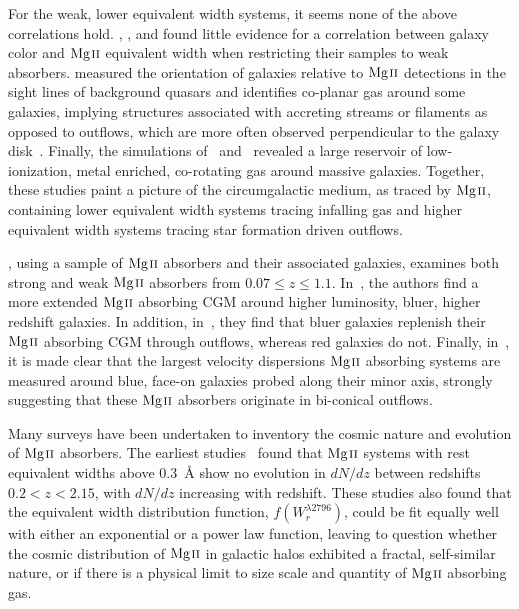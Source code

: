 \documentclass[iop,apj,numberedappendix,appendixfloats,twocolappendix]{emulateapj}
\begin{document}
For the weak, lower equivalent width systems, it seems none of the above correlations hold. \cite{Chen2010b}, \cite{Kacprzak2011}, and \cite{Lovegrove2011} found little evidence for a correlation between galaxy color and ${\hbox{{\rm Mg}\kern 0.1em{\sc ii}}}$ equivalent width when restricting their samples to weak absorbers. \cite{Kacprzak2011} measured the orientation of galaxies relative to ${\hbox{{\rm Mg}\kern 0.1em{\sc ii}}}$ detections in the sight lines of background quasars and identifies co-planar gas around some galaxies, implying structures associated with accreting streams or filaments as opposed to outflows, which are more often observed perpendicular to the galaxy disk~\citep{Bordoloi2011,Kacprzak2012-PA}. Finally, the simulations of~\cite{Stewart2011} and~\cite{Ford2013mass} revealed a large reservoir of low-ionization, metal enriched, co-rotating gas around massive galaxies. Together, these studies paint a picture of the circumgalactic medium, as traced by ${\hbox{{\rm Mg}\kern 0.1em{\sc ii}}}$, containing lower equivalent width systems tracing infalling gas and higher equivalent width systems tracing star formation driven outflows.

\cite{MAGIICAT1}, using a sample of ${\hbox{{\rm Mg}\kern 0.1em{\sc ii}}}$ absorbers and their associated galaxies, examines both strong and weak ${\hbox{{\rm Mg}\kern 0.1em{\sc ii}}}$ absorbers from $0.07 \le z \le 1.1$. In~\cite{MAGIICAT2}, the authors find a more extended ${\hbox{{\rm Mg}\kern 0.1em{\sc ii}}}$ absorbing CGM around higher luminosity, bluer, higher redshift galaxies. In addition, in~\cite{MAGIICAT4}, they find that bluer galaxies replenish their ${\hbox{{\rm Mg}\kern 0.1em{\sc ii}}}$ absorbing CGM through outflows, whereas red galaxies do not. Finally, in~\cite{MAGIICAT5}, it is made clear that the largest velocity dispersions ${\hbox{{\rm Mg}\kern 0.1em{\sc ii}}}$ absorbing systems are measured around blue, face-on galaxies probed along their minor axis, strongly suggesting that these ${\hbox{{\rm Mg}\kern 0.1em{\sc ii}}}$ absorbers originate in bi-conical outflows.

Many surveys have been undertaken to inventory the cosmic nature and evolution of ${\hbox{{\rm Mg}\kern 0.1em{\sc ii}}}$ absorbers. The earliest studies~\citep{Lanzetta1987,Tytler1987,Sargent1988,Steidel1992} found that ${\hbox{{\rm Mg}\kern 0.1em{\sc ii}}}$ systems with rest equivalent widths above $0.3$~{\AA} show no evolution in $dN\!/dz$ between redshifts $0.2 < z < 2.15$, with $dN\!/dz$ increasing with redshift. These studies also found that the equivalent width distribution function, $f(W_r^{\lambda2796})$, could be fit equally well with either an exponential or a power law function, leaving to question whether the cosmic distribution of ${\hbox{{\rm Mg}\kern 0.1em{\sc ii}}}$ in galactic halos exhibited a fractal, self-similar nature, or if there is a physical limit to size scale and quantity of ${\hbox{{\rm Mg}\kern 0.1em{\sc ii}}}$ absorbing gas. 
\end{document}
